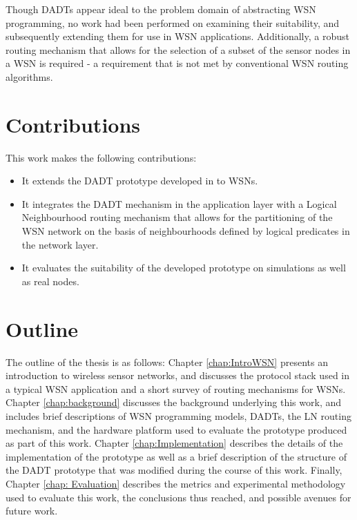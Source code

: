 Though DADTs appear ideal to the problem domain of abstracting WSN programming,
no work had been performed on examining their suitability, and subsequently
extending them for use in WSN applications. Additionally, a robust routing
mechanism that allows for the selection of a subset of the sensor nodes in a WSN
is required - a requirement that is not met by conventional WSN routing
algorithms.

\section{Contributions}

This work makes the following contributions:

\begin{itemize}
\item It extends the DADT prototype developed in \cite{migliavacca_DADT:2006} to WSNs.
\item It integrates the DADT mechanism in the application layer with a Logical
Neighbourhood \cite{mottola_LNAbstraction} routing mechanism that allows for the partitioning of
the WSN network on the basis of neighbourhoods defined by logical predicates in the network layer.
\item It evaluates the suitability of the developed prototype on simulations as well as real nodes.
\end{itemize}

\section{Outline}
The outline of the thesis is as follows: Chapter \ref{chap:IntroWSN} presents an
introduction to wireless sensor networks, and discusses the protocol stack used
in a typical WSN application and a short survey of routing mechanisms for WSNs.
Chapter \ref{chap:background} discusses the background underlying this work, and
includes brief descriptions of WSN programming models, DADTs, the LN routing mechanism,
and the hardware platform used to evaluate the prototype produced as part of this
work. Chapter \ref{chap:Implementation} describes the details of the
implementation of the prototype as well as a brief description of the structure of the DADT prototype
that was modified during the course of this work. Finally, Chapter \ref{chap:
Evaluation} describes the metrics and experimental methodology used to evaluate this work, the
conclusions thus reached, and possible avenues for future work.








